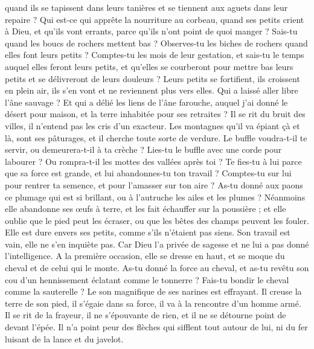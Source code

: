 \begin{multicols}{2}
quand ils se tapissent dans leurs tanières et se tiennent aux aguets dans leur repaire ?
Qui est-ce qui apprête la nourriture au corbeau, quand ses petits crient à Dieu, et qu'ils vont errants, parce qu'ils n'ont point de quoi manger ?
Sais-tu quand les boucs de rochers mettent bas ? Observes-tu les biches de rochers quand elles font leurs petits ?
Comptes-tu les mois de leur gestation, et sais-tu le temps auquel elles feront leurs petits,
et qu'elles se courberont pour mettre bas leurs petits et se délivreront de leurs douleurs ?
Leurs petits se fortifient, ils croissent en plein air, ils s'en vont et ne reviennent plus vers elles.
Qui a laissé aller libre l'âne sauvage ? Et qui a délié les liens de l'âne farouche,
auquel j'ai donné le désert pour maison, et la terre inhabitée pour ses retraites ?
Il se rit du bruit des villes, il n'entend pas les cris d'un exacteur.
Les montagnes qu'il va épiant çà et là, sont ses pâturages, et il cherche toute sorte de verdure. 
Le buffle voudra-t-il te servir, ou demeurera-t-il à ta crèche ? 
Lies-tu le buffle avec une corde pour labourer ? Ou rompra-t-il les mottes des vallées après toi ? 
Te fies-tu à lui parce que sa force est grande, et lui abandonnes-tu ton travail ? 
Comptes-tu sur lui pour rentrer ta semence, et pour l'amasser sur ton aire ? 
As-tu donné aux paons ce plumage qui est si brillant, ou à l'autruche les ailes et les plumes ? 
Néanmoins elle abandonne ses œufs à terre, et les fait échauffer sur la poussière ;
et elle oublie que le pied peut les écraser, ou que les bêtes des champs peuvent les fouler. 
Elle est dure envers ses petits, comme s'ils n'étaient pas siens. Son travail est vain, elle ne s'en inquiète pas.
Car Dieu l'a privée de sagesse et ne lui a pas donné l'intelligence.
A la première occasion, elle se dresse en haut, et se moque du cheval et de celui qui le monte. 
As-tu donné la force au cheval, et as-tu revêtu son cou d'un hennissement éclatant comme le tonnerre ? 
Fais-tu bondir le cheval comme la sauterelle ? Le son magnifique de ses narines est effrayant.
Il creuse la terre de son pied, il s'égaie dans sa force, il va à la rencontre d'un homme armé.
Il se rit de la frayeur, il ne s'épouvante de rien, et il ne se détourne point de devant l'épée.
Il n'a point peur des flèches qui sifflent tout autour de lui, ni du fer luisant de la lance et du javelot. 

\end{multicols}
